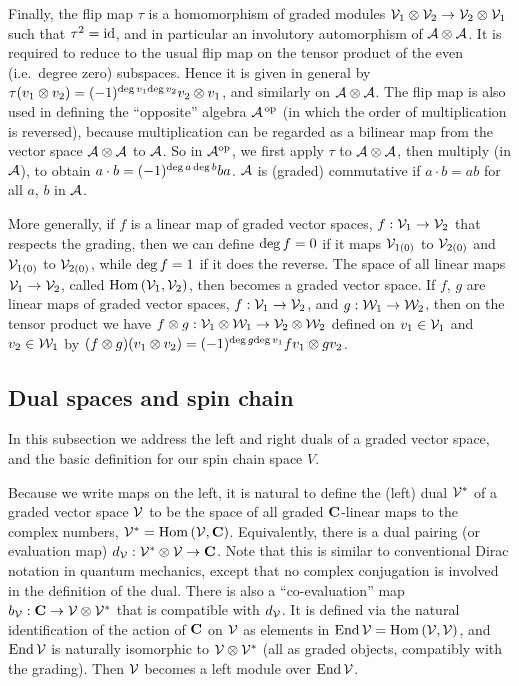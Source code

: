 \documentclass[twocolumn,floats,pra]{revtex4}
\def \cA {{\cal A}}
\begin{document}
Finally, the flip map $\tau$ is a homomorphism of graded modules
${\cal V}_1\otimes{\cal V}_2\to {\cal V}_2\otimes{\cal V}_1$ such
that $\tau^2={\rm id}$, and in particular an involutory
automorphism of $\cA\otimes\cA$. It is required to reduce to the
usual flip map on the tensor product of the even (i.e.\ degree
zero) subspaces. Hence it is given in general by $\tau(v_1\otimes
v_2)=(-1)^{{\rm deg}\, v_1{\rm deg}\,v_2}v_2\otimes v_1$, and
similarly on $\cA\otimes\cA$. The flip map is also used in
defining the ``opposite'' algebra $\cA^{\,\rm op}$ (in which the
order of multiplication is reversed), because multiplication can
be regarded as a bilinear map from the vector space
$\cA\otimes\cA$ to $\cA$. So in $\cA^{\rm op}$, we first apply
$\tau$ to $\cA\otimes\cA$, then multiply (in $\cA$), to obtain
$a\cdot b=(-1)^{{\rm deg}\, a\,{\rm deg}\, b}ba$. $\cA$ is
(graded) commutative if $a\cdot b=ab$ for all $a$, $b$ in $\cA$.

More generally, if $f$ is a linear map of graded vector spaces,
$f:{\cal V}_1\to{\cal V}_2$ that respects the grading, then we can
define ${\rm deg}\,f=0$ if it maps ${\cal V}_{1(0)}$ to ${\cal
V}_{2(0)}$ and ${\cal V}_{1(0)}$ to ${\cal V}_{2(0)}$, while ${\rm
deg} \, f=1$ if it does the reverse. The space of all linear maps
${\cal V}_1\to{\cal V}_2$, called ${\rm Hom}\,({\cal V}_1,{\cal
V}_2)$, then becomes a graded vector space. If $f$, $g$ are linear
maps of graded vector spaces, $f:{\cal V}_1\to{\cal V}_2$, and
$g:{\cal W}_1\to{\cal W}_2$, then on the tensor product we have
$f\otimes g:{\cal V}_1\otimes{\cal W}_1\to{\cal V}_2\otimes{\cal
W}_2$ defined on $v_1\in {\cal V}_1$ and $v_2\in {\cal W}_1$ by
$(f\otimes g)(v_1\otimes v_2)=(-1)^{{\rm deg}\, g {\rm
deg}\,v_1}fv_1\otimes gv_2$.

\subsection{Dual spaces and spin chain}

In this subsection we address the left and right duals of a graded
vector space, and the basic definition for our spin chain space
$V$.

Because we write maps on the left, it is natural to define the
(left) dual ${\cal V}^*$ of a graded vector space $\cal V$ to be
the space of all graded $\bf C$-linear maps to the complex
numbers, ${\cal V}^*={\rm Hom}\,({\cal V},{\bf C})$. Equivalently,
there is a dual pairing (or evaluation map) $d_{\cal V}:{\cal
V}^*\otimes {\cal V}\to{\bf C}$. Note that this is similar to
conventional Dirac notation in quantum mechanics, except that no
complex conjugation is involved in the definition of the dual.
There is also a ``co-evaluation'' map $b_{\cal V}:{\bf C}\to{\cal
V}\otimes {\cal V}^*$ that is compatible with $d_{\cal V}$. It is
defined via the natural identification of the action of $\bf C$ on
$\cal V$ as elements in ${\rm End}\,{\cal V}={\rm Hom}\,({\cal
V},{\cal V})$, and ${\rm End}\,{\cal V}$ is naturally isomorphic
to ${\cal V}\otimes {\cal V}^*$ (all as graded objects, compatibly
with the grading). Then $\cal V$ becomes a left module over ${\rm
End}\,{\cal V}$.
\end{document}
